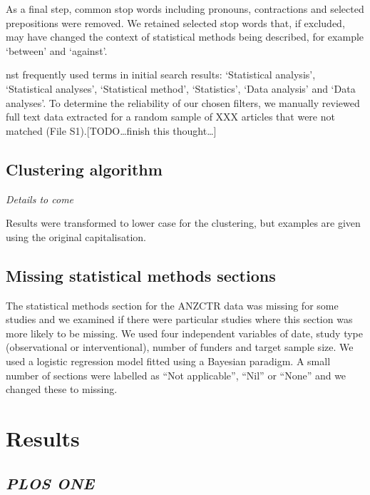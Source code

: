 \documentclass[12pt]{article}
\begin{document}
As a final step, common stop words including pronouns, contractions and
selected prepositions were removed. We retained selected stop words
that, if excluded, may have changed the context of statistical methods
being described, for example `between' and `against'.

nst frequently used terms in initial search results: `Statistical
analysis', `Statistical analyses', `Statistical method', `Statistics',
`Data analysis' and `Data analyses'. To determine the reliability of our
chosen filters, we manually reviewed full text data extracted for a
random sample of XXX articles that were not matched (File
S1).{[}TODO\ldots finish this thought\ldots{]}

\subsection{Clustering algorithm}

\emph{Details to come}

Results were transformed to lower case for the clustering, but examples
are given using the original capitalisation.

\subsection{Missing statistical methods sections}

The statistical methods section for the ANZCTR data was missing for some
studies and we examined if there were particular studies where this
section was more likely to be missing. We used four independent
variables of date, study type (observational or interventional), number
of funders and target sample size. We used a logistic regression model
fitted using a Bayesian paradigm. A small number of sections were
labelled as ``Not applicable'', ``Nil'' or ``None'' and we changed these
to missing.

\hypertarget{results}{%
\section{Results}\label{results}}

\hypertarget{plos-one}{%
\subsection{\texorpdfstring{\emph{PLOS ONE}}{PLOS ONE}}\label{plos-one}}
\end{document}
